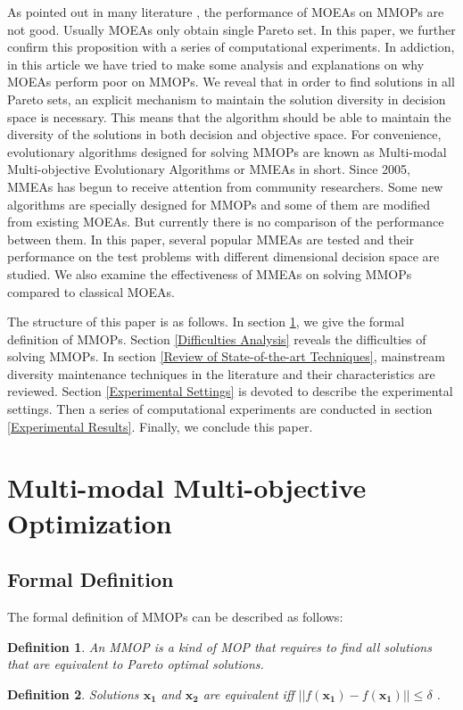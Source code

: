 \documentclass[conference]{IEEEtran}
\newtheorem{definition}{Definition}
\begin{document}
As pointed out in many literature\cite{Tanabe2019} \cite{Liang2016}, the performance of MOEAs on MMOPs are not good. Usually MOEAs only obtain single Pareto set. In this paper, we further confirm this proposition with a series of computational experiments. In addiction, in this article we have tried to make some analysis and explanations on why MOEAs perform poor on MMOPs. We reveal that in order to find solutions in all Pareto sets, an explicit mechanism to maintain the solution diversity in decision space is necessary. This means that the algorithm should be able to maintain the diversity of the solutions in both decision and objective space. For convenience, evolutionary algorithms designed for solving MMOPs are known as Multi-modal Multi-objective Evolutionary Algorithms or MMEAs in short. Since 2005, MMEAs has begun to receive attention from community researchers. Some new algorithms are specially designed for MMOPs and some of them are modified from existing MOEAs. But currently there is no comparison of the performance between them. In this paper, several popular MMEAs are tested and their performance on the test problems with different dimensional decision space are studied. We also examine the effectiveness of MMEAs on solving MMOPs compared to classical MOEAs.

The structure of this paper is as follows. In section \ref{Multi-modal Multi-objective Optimization}, we give the formal definition of MMOPs. Section \ref{Difficulties Analysis} reveals the difficulties of solving MMOPs. In section \ref{Review of State-of-the-art Techniques}, mainstream diversity maintenance techniques in the literature and their characteristics are reviewed. Section \ref{Experimental Settings} is devoted to describe the experimental settings. Then a series of computational experiments are conducted in section \ref{Experimental Results}. Finally, we conclude this paper.
\section{Multi-modal Multi-objective Optimization}
\label{Multi-modal Multi-objective Optimization}
\subsection{Formal Definition}
The formal definition of MMOPs can be described as follows\cite{Tanabe2019}:
\begin{definition}
An MMOP is a kind of MOP that requires to find all solutions that are equivalent to Pareto optimal solutions. 
\end{definition}
\begin{definition}
Solutions $\boldsymbol{x_1}$ and  $\boldsymbol{x_2}$ are equivalent  iff $||f(\boldsymbol{x_1}) - f(\boldsymbol{x_1})|| \leq \delta$ .
\end{definition}
\end{document}
